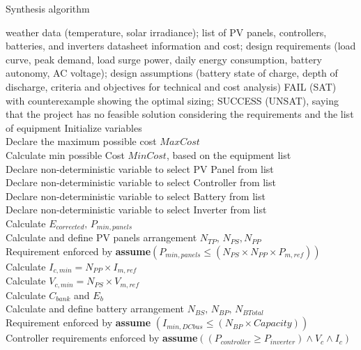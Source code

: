  \begin{algorithm}
 \caption{Synthesis algorithm}
 \begin{algorithmic}[1]
 \renewcommand{\algorithmicrequire}{\textbf{Input:}}
 \renewcommand{\algorithmicensure}{\textbf{Output:}}
  \REQUIRE weather data (temperature, solar irradiance); list of PV panels, controllers, batteries, and inverters datasheet information and cost; design requirements (load curve, peak demand, load surge power, daily energy consumption, battery autonomy, AC voltage); design assumptions (battery state of charge, depth of discharge, criteria and objectives for technical and cost analysis)
 \ENSURE FAIL (SAT) with counterexample showing the optimal sizing; SUCCESS (UNSAT), saying that the project has no feasible solution considering the requirements and the list of equipment
  \STATE Initialize variables \\
  \STATE Declare the maximum possible cost $MaxCost$  \\
  \STATE Calculate min possible Cost $MinCost$, based on the equipment list \\
 	\STATE Declare non-deterministic variable to select PV Panel from list \\
 	\STATE Declare non-deterministic variable to select Controller from list \\
 	\STATE Declare non-deterministic variable to select Battery from list \\
 	\STATE Declare non-deterministic variable to select Inverter from list \\ 	
 	\STATE Calculate $E_{corrected}, \, P_{min,panels} $ \\
	\STATE Calculate and define PV panels arrangement $N_{TP}, \, N_{PS}, N_{PP} $ \\
	\STATE Requirement enforced by \textbf{assume}$(P_{min,panels} \leq (N_{PS} \times N_{PP} \times P_{m,ref}))$ \\
	\STATE Calculate $I_{c,min} = N_{PP} \times I_{m,ref}$ \\
	\STATE Calculate $V_{c,min} = N_{PS} \times V_{m,ref}$ \\
 	\STATE Calculate $C_{bank}$ and $E_{b}$ \\
	\STATE Calculate and define battery arrangement $N_{BS}, \, N_{BP}, \, N_{BTotal}$ \\
	\STATE Requirement enforced by \textbf{assume} $(I_{min,DCbus} \leq (N_{BP} \times Capacity))$ \\
 	\STATE Controller requirements enforced by \textbf{assume}$((P_{controller} \geq P_{inverter}) \wedge V_{c} \wedge I_{c})$ \\

\end{algorithmic}
\end{algorithm}
